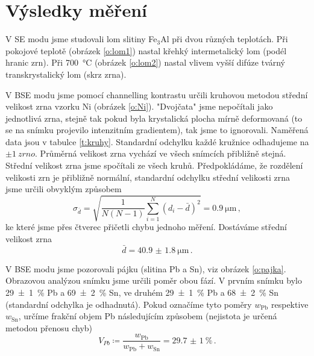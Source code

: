 \section*{Výsledky měření}
V SE modu jsme studovali lom slitiny Fe$_3$Al při dvou různých teplotách. Při pokojové teplotě (obrázek \ref{o:lom1}) nastal křehký intermetalický lom (podél hranic zrn). Při \SI{700}{\degreeCelsius} (obrázek \ref{o:lom2}) nastal vlivem vyšší difúze tvárný transkrystalický lom (skrz zrna).

V BSE modu jsme pomocí channelling kontrastu určili kruhovou metodou střední velikost zrna vzorku Ni (obrázek \ref{o:Ni}). "Dvojčata" jsme nepočítali jako jednotlivá zrna, stejně tak pokud byla krystalická plocha mírně deformovaná (to se na snímku projevilo intenzitním gradientem), tak jsme to ignorovali. Naměřená data jsou v tabulce \ref{t:kruhy}. Standardní odchylku každé kružnice odhadujeme na $\pm \SI{1}{zrno}$. Průměrná velikost zrna vychází ve všech snímcích přibližně stejná. Střední velikost zrna jsme spočítali ze všech kruhů. Předpokládáme, že rozdělení velikosti zrn je přibližně normální, standardní odchylku střední velikosti zrna jsme určili obvyklým způsobem
\begin{equation*}
\sigma_{\bar{d}}= \sqrt{\frac{1}{N(N-1)} \sum_{i=1}^{N}(d_i-\bar{d})^2  }=\SI{0.9}{\um} \,,
\end{equation*}
ke které jsme přes čtverec přičetli chybu jednoho měření.
Dostáváme střední velikost zrna
\begin{equation*}
\bar{d}=\SI{40.9(18)}{\um} \,.
\end{equation*}

V BSE modu jsme pozorovali pájku (slitina Pb a Sn), viz obrázek \ref{o:pajka}. Obrazovou analýzou snímku jsme určili poměr obou fází. V prvním snímku bylo \SI{29(1)}{\percent} Pb a \SI{69(2)}{\percent} Sn, ve druhém \SI{29(1)}{\percent} Pb a \SI{68(2)}{\percent} Sn (standardní odchylka je odhadnutá).
Pokud označíme tyto poměry $w_{\text{Pb}}$ respektive $w_{\text{Sn}}$, určíme frakční objem Pb následujícím způsobem (nejistota je určená metodou přenosu chyb)
\begin{equation*}
V_{Pb} \coloneqq \frac{w_{\text{Pb}}}{w_{\text{Pb}}+w_{\text{Sn}}}=\SI{29.7(10)}{\percent} \,.
\end{equation*}






